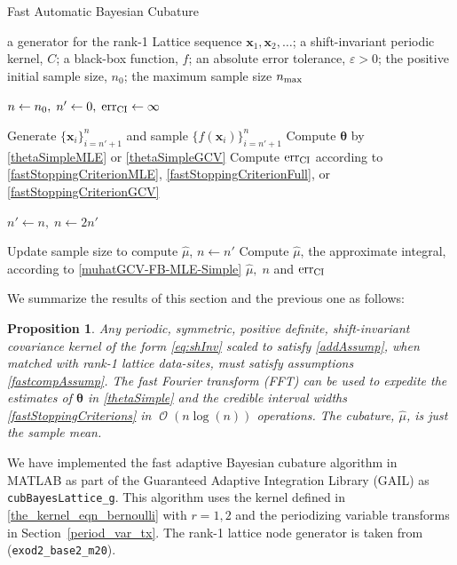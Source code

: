 \documentclass[twocolumn]{svjour3}          %
\DeclareMathOperator{\Order}{{\mathcal O}}
\newtheorem{prop}{Proposition}
\newcommand{\bm}[1]{\boldsymbol{#1}}
\newcommand{\vtheta}{{\bm{\theta}}}
\newcommand{\vx}{\bm{x}}
\newcommand{\hmu}{\widehat{\mu}}
\newcommand{\err}{\textup{err}}
\newcommand{\code}[1]{\texttt{#1}}
\newcommand\secref{Section~\ref}
\begin{document}
\begin{algorithm}
	\caption{Fast Automatic Bayesian Cubature}\label{algorithm2}
	\begin{algorithmic}[1]
		\Require a generator for the rank-1 Lattice sequence
		$\vx_1, \vx_2, \ldots$; 
		a shift-invariant periodic kernel, $C$;
		a black-box function, $f$; 
		an absolute error tolerance,
		$\varepsilon>0$; the positive initial sample size, $n_0$;
		the maximum sample size $n_{\textup{max}}$
		
		\State $n \gets n_0, \; n' \gets 0, \; \err_{\textup{CI}} \gets \infty$
		
		\While{$\err_{\textup{CI}} > \varepsilon$ and $n \le n_{\textup{max}}$}
		
		\State\label{LoopStart}Generate $\{ \vx_i\}_{i=n' + 1}^{n}$ and sample $\{f(\vx_i)\}_{i=n'+1}^{n}$
		\State Compute $\vtheta$ by \eqref{thetaSimpleMLE} or \eqref{thetaSimpleGCV}
		\State Compute $\err_{\textup{CI}}$  according to \eqref{fastStoppingCriterionMLE}, \eqref{fastStoppingCriterionFull}, or \eqref{fastStoppingCriterionGCV}
		
		\State	$n' \gets n, \; n \gets 2n'$
		
		\EndWhile
		
		\State Update sample size to compute $\hmu$, $n \gets n'$
		\State Compute $\hmu$, the approximate integral,   according to \eqref{muhatGCV-FB-MLE-Simple}
		\State \Return $\hmu, \; n$  and $\err_{\textup{CI}}$
	\end{algorithmic}
\end{algorithm}

We summarize the results of this section and the previous one as follows:
\begin{prop}
Any periodic, symmetric, positive definite, shift-invariant covariance kernel of the form \eqref{eq:shInv} scaled to satisfy \eqref{addAssump}, when matched with rank-1 lattice data-sites, must satisfy assumptions \eqref{fastcompAssump}.  The \emph{fast Fourier transform} (FFT) can be used to expedite the estimates of $\vtheta$ in \eqref{thetaSimple} and the credible interval widths \eqref{fastStoppingCriterions} in $\Order(n \log(n))$ operations. The cubature, $\hmu$, is just the sample mean.
\end{prop}

We have implemented the fast adaptive Bayesian cubature algorithm in MATLAB as part of the Guaranteed Adaptive Integration Library (GAIL) \cite{ChoEtal17b} as \allowbreak \code{cubBayesLattice\_g}. This algorithm uses the kernel defined in  \eqref{the_kernel_eqn_bernoulli} with  $r=1,2$ and the periodizing variable transforms in  \secref{period_var_tx}.  The rank-1 lattice node generator is taken from \cite{Nuy17a} (\code{exod2\_base2\_m20}).
\end{document}
